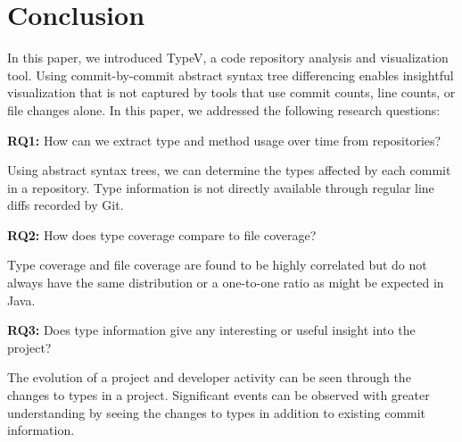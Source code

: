 \section{Conclusion}

In this paper, we introduced TypeV, a code repository analysis and visualization tool. Using commit-by-commit abstract syntax tree differencing enables insightful visualization that is not captured by tools that use commit counts, line counts, or file changes alone. In this paper, we addressed the following research questions:

\textbf{RQ1:} How can we extract type and method usage over time from repositories?

\begin{framed}
\noindent
Using abstract syntax trees, we can determine the types affected by each commit in a repository. Type information is not directly available through regular line diffs recorded by Git.
\end{framed}

\textbf{RQ2:} How does type coverage compare to file coverage?

\begin{framed}
\noindent
Type coverage and file coverage are found to be highly correlated but do not always have the same distribution or a one-to-one ratio as might be expected in Java.
\end{framed}

\textbf{RQ3:} Does type information give any interesting or useful insight into the project?

\begin{framed}
\noindent
The evolution of a project and developer activity can be seen through the changes to types in a project. Significant events can be observed with greater understanding by seeing the changes to types in addition to existing commit information.
\end{framed}


